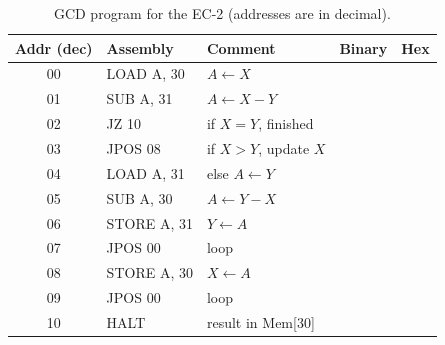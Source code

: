 \documentclass{article}
\begin{document}
\begin{table}[H]
    \centering
    \begin{tabular}{|c|l|l|c|c|}
        \hline
        \textbf{Addr (dec)} & \textbf{Assembly} & \textbf{Comment} & \textbf{Binary} & \textbf{Hex} \\
        \hline
        00 & LOAD A, 30 & $A \leftarrow X$ & & \\ \hline
        01 & SUB A, 31 & $A \leftarrow X - Y$ & & \\ \hline
        02 & JZ 10 & if $X = Y$, finished & & \\ \hline
        03 & JPOS 08 & if $X > Y$, update $X$ & & \\ \hline
        04 & LOAD A, 31 & else $A \leftarrow Y$ & & \\ \hline
        05 & SUB A, 30 & $A \leftarrow Y - X$ & & \\ \hline
        06 & STORE A, 31 & $Y \leftarrow A$ & & \\ \hline
        07 & JPOS 00 & loop & & \\ \hline
        08 & STORE A, 30 & $X \leftarrow A$ & & \\ \hline
        09 & JPOS 00 & loop & & \\ \hline
        10 & HALT & result in Mem[30] & & \\ \hline
    \end{tabular}
    \caption{GCD program for the EC-2 (addresses are in decimal).}
    \label{tab:gcd}
\end{table}
\end{document}
